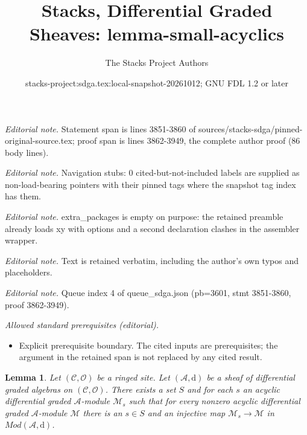 \documentclass[10pt,a4paper]{amsart}
\title{Stacks, Differential Graded Sheaves: lemma-small-acyclics}
\author{The Stacks Project Authors}
\date{stacks-project:sdga.tex:local-snapshot-20261012; GNU FDL 1.2 or later}
\theoremstyle{plain}
\newtheorem{lemma}[subsection]{Lemma}
\theoremstyle{definition}
\theoremstyle{remark}
\numberwithin{equation}{subsection}
\begin{document}
\maketitle
\noindent\textit{Editorial note.} Statement span is lines 3851-3860 of sources/stacks-sdga/pinned-original-source.tex; proof span is lines 3862-3949, the complete author proof (86 body lines).\par\medskip
\noindent\textit{Editorial note.} Navigation stubs: 0 cited-but-not-included labels are supplied as non-load-bearing pointers with their pinned tags where the snapshot tag index has them.\par\medskip
\noindent\textit{Editorial note.} extra\_packages is empty on purpose: the retained preamble already loads xy with options and a second declaration clashes in the assembler wrapper.\par\medskip
\noindent\textit{Editorial note.} Text is retained verbatim, including the author's own typos and placeholders.\par\medskip
\noindent\textit{Editorial note.} Queue index 4 of queue\_sdga.json (pb=3601, stmt 3851-3860, proof 3862-3949).\par\medskip
\noindent\textit{Allowed standard prerequisites (editorial).}\begin{itemize}
\item Explicit prerequisite boundary. The cited inputs are prerequisites; the argument in the retained span is not replaced by any cited result.
\end{itemize}\medskip
\begin{lemma}
\label{lemma-small-acyclics}
Let $(\mathcal{C}, \mathcal{O})$ be a ringed site.
Let $(\mathcal{A}, \text{d})$ be a sheaf of differential graded algebras
on $(\mathcal{C}, \mathcal{O})$. There exists a set $S$ and for each $s$
an acyclic differential graded $\mathcal{A}$-module $\mathcal{M}_s$ such
that for every nonzero acyclic differential graded $\mathcal{A}$-module
$\mathcal{M}$ there is an $s \in S$ and an injective map
$\mathcal{M}_s \to \mathcal{M}$ in $\textit{Mod}(\mathcal{A}, \text{d})$.
\end{lemma}
\end{document}
